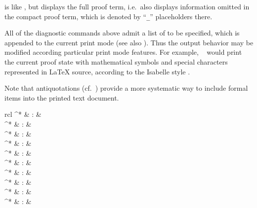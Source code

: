\begin{isabellebody}
\begin{isamarkuptext}
\begin{descr}
  \item [\isa{\isacommand{full{\isacharunderscore}prf}}] is like , but displays
  the full proof term, i.e.\ also displays information omitted in the
  compact proof term, which is denoted by ``\verb|_|''
  placeholders there.

  \end{descr}

  All of the diagnostic commands above admit a list of 
  to be specified, which is appended to the current print mode (see
  also \cite{isabelle-ref}).  Thus the output behavior may be modified
  according particular print mode features.  For example, ~ would print the current
  proof state with mathematical symbols and special characters
  represented in {\LaTeX} source, according to the Isabelle style
  \cite{isabelle-sys}.

  Note that antiquotations (cf.\ ) provide a more
  systematic way to include formal items into the printed text
  document.%
\end{isamarkuptext}%
\isamarkuptrue%
%
\isamarkuptrue%
%
\begin{isamarkuptext}%
\begin{matharray}{rcl}
    ^* & : & \isarkeep{\cdot} \\
    ^* & : &  \\
    ^* & : &  \\
    ^* & : &  \\
    ^* & : &  \\
    ^* & : &  \\
    ^* & : &  \\
    ^* & : &  \\
    ^* & : &  \\
    ^* & : &  \\
  \end{matharray}


\end{isamarkuptext}
\end{isabellebody}
